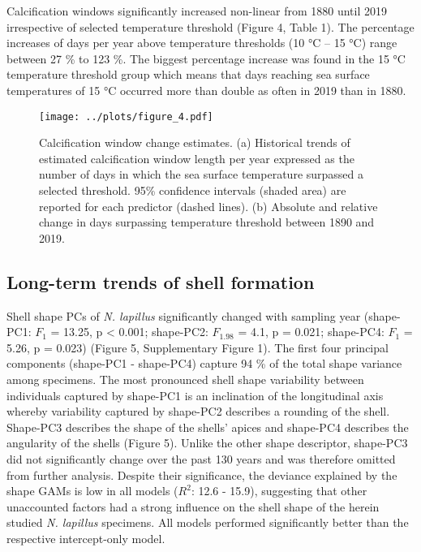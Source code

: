 \documentclass[smallextended]{svjour3}       %
\begin{document}
Calcification windows significantly increased non-linear from 1880 until
2019 irrespective of selected temperature threshold (Figure 4, Table 1).
The percentage increases of days per year above temperature thresholds
(10 °C -- 15 °C) range between 27 \% to 123 \%. The biggest percentage
increase was found in the 15 °C temperature threshold group which means
that days reaching sea surface temperatures of 15 °C occurred more than
double as often in 2019 than in 1880.

\begin{figure}
\centering
\texttt{[image: ../plots/figure\_4.pdf]}
\caption{Calcification window change estimates. (a) Historical trends of
estimated calcification window length per year expressed as the number
of days in which the sea surface temperature surpassed a selected
threshold. 95\% confidence intervals (shaded area) are reported for each
predictor (dashed lines). (b) Absolute and relative change in days
surpassing temperature threshold between 1890 and 2019.}
\end{figure}

\hypertarget{long-term-trends-of-shell-formation}{%
\subsection{Long-term trends of shell
formation}\label{long-term-trends-of-shell-formation}}

Shell shape PCs of \emph{N. lapillus} significantly changed with
sampling year (shape-PC1: \(F_{1}\) = 13.25, p \textless{} 0.001;
shape-PC2: \(F_{1.98}\) = 4.1, p = 0.021; shape-PC4: \(F_{1}\) = 5.26, p
= 0.023) (Figure 5, Supplementary Figure 1). The first four principal
components (shape-PC1 - shape-PC4) capture 94 \% of the total shape
variance among specimens. The most pronounced shell shape variability
between individuals captured by shape-PC1 is an inclination of the
longitudinal axis whereby variability captured by shape-PC2 describes a
rounding of the shell. Shape-PC3 describes the shape of the shells'
apices and shape-PC4 describes the angularity of the shells (Figure 5).
Unlike the other shape descriptor, shape-PC3 did not significantly
change over the past 130 years and was therefore omitted from further
analysis. Despite their significance, the deviance explained by the
shape GAMs is low in all models (\(R^2\): 12.6 - 15.9), suggesting that
other unaccounted factors had a strong influence on the shell shape of
the herein studied \emph{N. lapillus} specimens. All models performed
significantly better than the respective intercept-only model.
\end{document}
